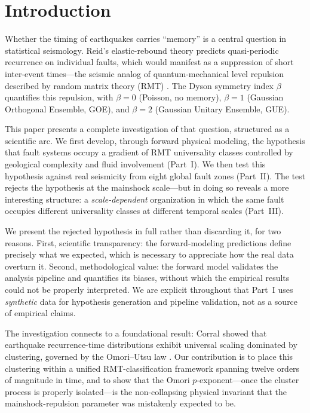 \documentclass[12pt,a4paper]{article}
\begin{document}
\section{Introduction}

Whether the timing of earthquakes carries ``memory'' is a central question in statistical seismology. Reid's elastic-rebound theory \citep{reid1910} predicts quasi-periodic recurrence on individual faults, which would manifest as a suppression of short inter-event times---the seismic analog of quantum-mechanical level repulsion described by random matrix theory (RMT) \citep{wigner1957,mehta2004}. The Dyson symmetry index $\beta$ quantifies this repulsion, with $\beta=0$ (Poisson, no memory), $\beta=1$ (Gaussian Orthogonal Ensemble, GOE), and $\beta=2$ (Gaussian Unitary Ensemble, GUE).

This paper presents a complete investigation of that question, structured as a scientific arc. We first develop, through forward physical modeling, the hypothesis that fault systems occupy a gradient of RMT universality classes controlled by geological complexity and fluid involvement (Part~I). We then test this hypothesis against real seismicity from eight global fault zones (Part~II). The test rejects the hypothesis at the mainshock scale---but in doing so reveals a more interesting structure: a \emph{scale-dependent} organization in which the same fault occupies different universality classes at different temporal scales (Part~III).

We present the rejected hypothesis in full rather than discarding it, for two reasons. First, scientific transparency: the forward-modeling predictions define precisely what we expected, which is necessary to appreciate how the real data overturn it. Second, methodological value: the forward model validates the analysis pipeline and quantifies its biases, without which the empirical results could not be properly interpreted. We are explicit throughout that Part~I uses \emph{synthetic} data for hypothesis generation and pipeline validation, not as a source of empirical claims.

The investigation connects to a foundational result: Corral \citep{corral2004} showed that earthquake recurrence-time distributions exhibit universal scaling dominated by clustering, governed by the Omori--Utsu law \citep{utsu1995}. Our contribution is to place this clustering within a unified RMT-classification framework spanning twelve orders of magnitude in time, and to show that the Omori $p$-exponent---once the cluster process is properly isolated---is the non-collapsing physical invariant that the mainshock-repulsion parameter was mistakenly expected to be.
\end{document}
